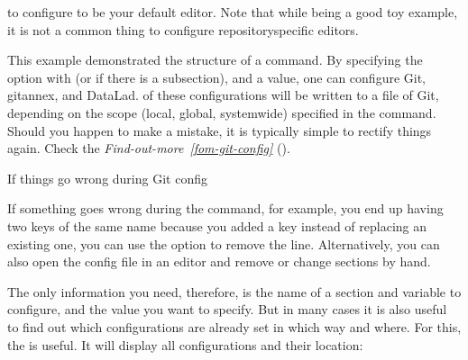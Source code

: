 \sphinxAtStartPar
to configure {\hyperref[\detokenize{glossary:term-vim}]{}} to be your default editor.
Note that while being a good toy example, it is not a common thing to
configure repository\sphinxhyphen{}specific editors.

\sphinxAtStartPar
This example demonstrated the structure of a 
command. By specifying the  option with 
(or  if there is a subsection), and
a value, one can configure Git, git\sphinxhyphen{}annex, and DataLad.
 of these configurations will be written to a  file
of Git, depending on the scope (local, global, system\sphinxhyphen{}wide)
specified in the command. Should you happen to make a mistake,
it is typically simple to rectify things again. Check the
\textit{Find-out-more}~{\findoutmoreiconinline}\textit{\ref{fom-git-config}} {\hyperref[\detokenize{basics/101-122-config:fom-git-config}]{}} ().

\ignorespaces \begin{findoutmore}[label={fom-git-config}, before title={\thetcbcounter\ }, float, floatplacement=tb, check odd page=true]{If things go wrong during Git config}
\label{\detokenize{basics/101-122-config:fom-git-config}}

\sphinxAtStartPar
If something goes wrong during the  command,
for example, you end up having two keys of the same name because you
added a key instead of replacing an existing one, you can use the
 option to remove the line. Alternatively, you can also open
the config file in an editor and remove or change sections by hand.


\end{findoutmore}

\sphinxAtStartPar
The only information you need, therefore, is the name of a section and
variable to configure, and the value you want to specify. But in many cases
it is also useful to find out which configurations are already set in
which way and where. For this, the 
is useful. It will display all configurations and their location:

